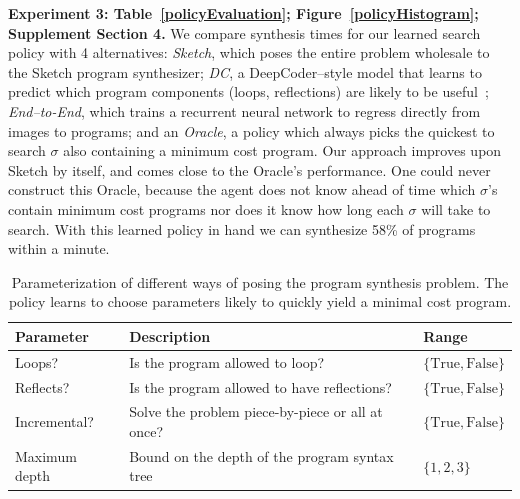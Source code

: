 \documentclass{article}
\theoremstyle{definition}
\begin{document}
\textbf{Experiment 3: Table~\ref{policyEvaluation}; Figure~\ref{policyHistogram}; Supplement Section 4.}
We compare synthesis times for our learned search policy
with 4 alternatives:
 \emph{Sketch}, which poses the
 entire problem wholesale to the Sketch program synthesizer;
 \emph{DC}, a DeepCoder--style model that learns to predict which program components (loops, reflections)
 are likely to be useful~\cite{BalGauBroetal16};
 \emph{End--to-End},
 which trains a recurrent neural network to regress directly from images to programs;
and an \emph{Oracle},
a policy which always picks the quickest to search $\sigma $
 also containing a minimum cost program.
Our approach improves upon Sketch by itself,
and comes close to the Oracle's performance.
One could never construct this Oracle,
because the agent does not know ahead of time which
$\sigma $'s contain minimum cost programs nor does it know how long each
$\sigma $ will take to search.
With this learned policy in hand we can synthesize 58\% of programs within a minute.
%
\begin{table}[h]\centering
  \caption{Parameterization of different ways of posing the program synthesis problem. The policy learns to choose parameters likely to quickly yield a minimal cost program.
  }\label{policyOutput}
  \begin{tabular}{lll}\toprule
  Parameter&Description&Range\\\midrule
  Loops?&Is the program allowed to loop?&$\{\text{True},\text{False}\}$\\
  Reflects?&Is the program allowed to have reflections?&$\{\text{True},\text{False}\}$\\
  Incremental?&Solve the problem piece-by-piece or all at once?&$\{\text{True},\text{False}\}$\\
  Maximum depth& Bound on the depth of the program syntax tree&$\{1,2,3\}$
  \\\bottomrule
  \end{tabular}\vspace{-0.5cm}
  \end{table}
\end{document}
